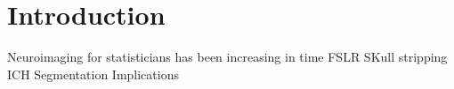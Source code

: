 \chapter{Introduction}

Neuroimaging for statisticians has been increasing in time
FSLR
SKull stripping
ICH Segmentation
Implications

